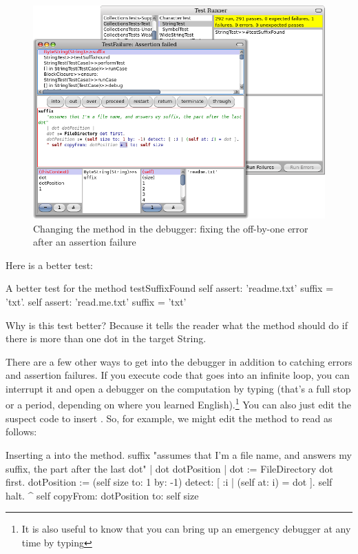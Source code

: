 \documentclass[a4paper,10pt,twoside]{book}
\begin{document}
\begin{figure}[btp]
	\begin{center}
		\includegraphics[width=\textwidth]{fixOffByOne}
	\end{center}
	\caption{Changing the  method in the debugger: fixing the off-by-one error after an \sunit assertion failure}
\end{figure}

Here is a better test:

\begin{method}[testSuffix2]{A better test for the  method}
testSuffixFound
	self assert: 'readme.txt' suffix = 'txt'.
	self assert: 'read.me.txt' suffix = 'txt'
\end{method}
\noindent
Why is this test better?  Because it tells the reader what the method should do if there is more than one dot in the target String.

There are a few other ways to get into the debugger in addition to catching errors and assertion failures.
If you execute code that goes into an infinite loop, you can interrupt it and open a debugger on the computation by typing  (that's a full stop or a period, depending  on where you learned English).\footnote{It is also useful to know that you can bring up an emergency debugger at any time by typing }
You can also just edit the suspect code to insert .
So, for example, we might edit the  method to read as follows:

\needspace{11ex}
\begin{method}[suffix]{Inserting a  into the  method.}
suffix
	"assumes that I'm a file name, and answers my suffix, the part after the last dot"
	| dot dotPosition |
	dot := FileDirectory dot first.
	dotPosition := (self size to: 1 by: -1) detect: [ :i | (self at: i) = dot ].
	self halt.
	^ self copyFrom: dotPosition to: self size 
\end{method}
\end{document}
